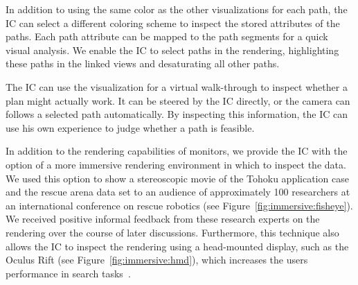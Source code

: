 \documentclass{egpubl}
\begin{document}
 In addition to using the same color as the other visualizations for each path, the IC can select a different coloring scheme to inspect the stored attributes of the paths. Each path attribute can be mapped to the path segments for a quick visual analysis. We enable the IC to select paths in the rendering, highlighting these paths in the linked views and desaturating all other paths.

The IC can use the visualization for a virtual walk-through to inspect whether a plan might actually work. It can be steered by the IC directly, or the camera can follows a selected path automatically. By inspecting this information, the IC can use his own experience to judge whether a path is feasible.

 In addition to the rendering capabilities of monitors, we provide the IC with the option of a more immersive rendering environment in which to inspect the data. We used this option to show a stereoscopic movie of the Tohoku application case and the rescue arena data set to an audience of approximately 100 researchers at an international conference on rescue robotics (see Figure~\ref{fig:immersive:fisheye}). We received positive informal feedback from these research experts on the rendering over the course of later discussions. Furthermore, this technique also allows the IC to inspect the rendering using a head-mounted display, such as the Oculus Rift (see Figure~\ref{fig:immersive:hmd}), which increases the users performance in search tasks~\cite{pausch1997quantifying}. 
\end{document}
